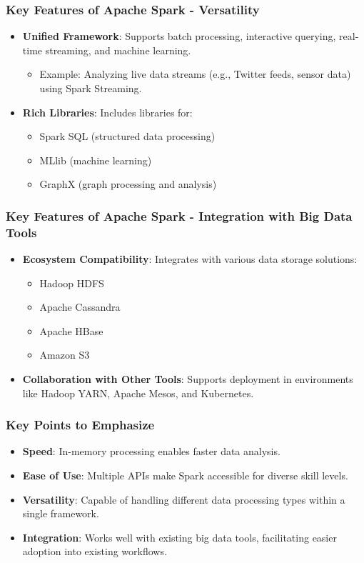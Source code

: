 \documentclass{beamer}
\begin{document}
\begin{frame}
    \frametitle{Key Features of Apache Spark - Versatility}
    \begin{itemize}
        \item \textbf{Unified Framework}: Supports batch processing, interactive querying, real-time streaming, and machine learning.
        \begin{itemize}
            \item Example: Analyzing live data streams (e.g., Twitter feeds, sensor data) using Spark Streaming.
        \end{itemize}
        
        \item \textbf{Rich Libraries}: Includes libraries for:
        \begin{itemize}
            \item Spark SQL (structured data processing)
            \item MLlib (machine learning)
            \item GraphX (graph processing and analysis)
        \end{itemize}
    \end{itemize}
\end{frame}

\begin{frame}
    \frametitle{Key Features of Apache Spark - Integration with Big Data Tools}
    \begin{itemize}
        \item \textbf{Ecosystem Compatibility}: Integrates with various data storage solutions:
        \begin{itemize}
            \item Hadoop HDFS
            \item Apache Cassandra
            \item Apache HBase
            \item Amazon S3
        \end{itemize}
        
        \item \textbf{Collaboration with Other Tools}: Supports deployment in environments like Hadoop YARN, Apache Mesos, and Kubernetes.
    \end{itemize}
\end{frame}

\begin{frame}
    \frametitle{Key Points to Emphasize}
    \begin{itemize}
        \item \textbf{Speed}: In-memory processing enables faster data analysis.
        \item \textbf{Ease of Use}: Multiple APIs make Spark accessible for diverse skill levels.
        \item \textbf{Versatility}: Capable of handling different data processing types within a single framework.
        \item \textbf{Integration}: Works well with existing big data tools, facilitating easier adoption into existing workflows.
    \end{itemize}
\end{frame}
\end{document}
